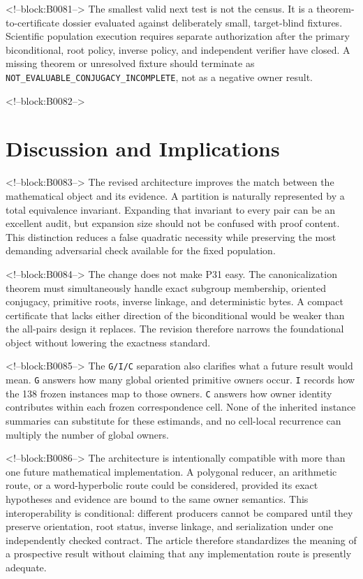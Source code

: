 \documentclass[11pt]{article}
\begin{document}
<!--block:B0081-->
The smallest valid next test is not the census. It is a
theorem-to-certificate dossier evaluated against deliberately small,
target-blind fixtures. Scientific population execution requires separate
authorization after the primary biconditional, root policy, inverse
policy, and independent verifier have closed. A missing theorem or
unresolved fixture should terminate as
\texttt{NOT\_EVALUABLE\_CONJUGACY\_INCOMPLETE}, not as a negative owner
result.

<!--block:B0082-->
\hypertarget{7-discussion-and-implications}{%
\section{Discussion and
Implications}\label{7-discussion-and-implications}}

<!--block:B0083-->
The revised architecture improves the match between the mathematical
object and its evidence. A partition is naturally represented by a total
equivalence invariant. Expanding that invariant to every pair can be an
excellent audit, but expansion size should not be confused with proof
content. This distinction reduces a false quadratic necessity while
preserving the most demanding adversarial check available for the fixed
population.

<!--block:B0084-->
The change does not make P31 easy. The canonicalization theorem must
simultaneously handle exact subgroup membership, oriented conjugacy,
primitive roots, inverse linkage, and deterministic bytes. A compact
certificate that lacks either direction of the biconditional would be
weaker than the all-pairs design it replaces. The revision therefore
narrows the foundational object without lowering the exactness standard.

<!--block:B0085-->
The \texttt{G/I/C} separation also clarifies what a future result would
mean. \texttt{G} answers how many global oriented primitive owners
occur. \texttt{I} records how the 138 frozen instances map to those
owners. \texttt{C} answers how owner identity contributes within each
frozen correspondence cell. None of the inherited instance summaries can
substitute for these estimands, and no cell-local recurrence can
multiply the number of global owners.

<!--block:B0086-->
The architecture is intentionally compatible with more than one future
mathematical implementation. A polygonal reducer, an arithmetic route,
or a word-hyperbolic route could be considered, provided its exact
hypotheses and evidence are bound to the same owner semantics. This
interoperability is conditional: different producers cannot be compared
until they preserve orientation, root status, inverse linkage, and
serialization under one independently checked contract. The article
therefore standardizes the meaning of a prospective result without
claiming that any implementation route is presently adequate.
\end{document}
